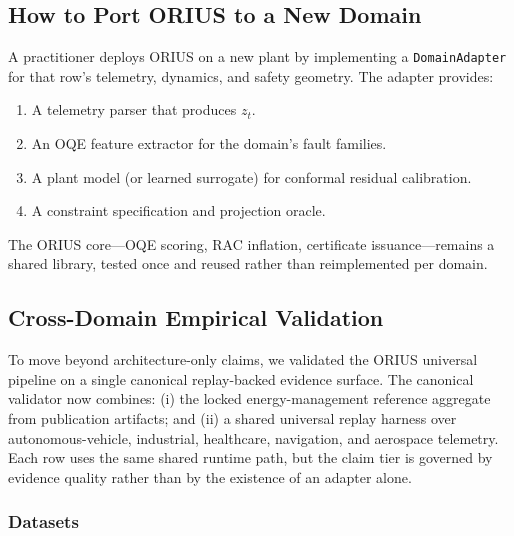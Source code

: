 \subsection{How to Port ORIUS to a New Domain}

A practitioner deploys ORIUS on a new plant by implementing a
\texttt{DomainAdapter} for that row's telemetry, dynamics, and safety
geometry.
The adapter provides:

\begin{enumerate}
  \item A telemetry parser that produces $z_t$.
  \item An OQE feature extractor for the domain's fault families.
  \item A plant model (or learned surrogate) for conformal residual
    calibration.
  \item A constraint specification and projection oracle.
\end{enumerate}

The ORIUS core---OQE scoring, RAC inflation, certificate issuance---remains
a shared library, tested once and reused rather than reimplemented per domain.

\subsection{Cross-Domain Empirical Validation}
\label{sec:cross-domain-eval}

To move beyond architecture-only claims, we validated the ORIUS universal
pipeline on a single canonical replay-backed evidence surface.  The
canonical validator now combines: (i) the locked energy-management reference
aggregate from publication artifacts; and (ii) a shared universal replay
harness over autonomous-vehicle, industrial, healthcare, navigation, and
aerospace telemetry.  Each row uses the same shared runtime path, but the
claim tier is governed by evidence quality rather than by the existence of
an adapter alone.

\subsubsection{Datasets}

